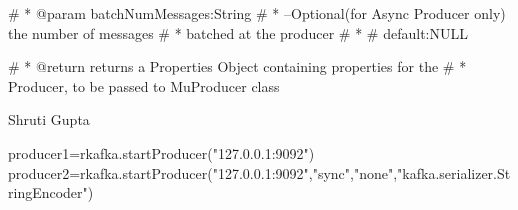 \documentclass[letterpaper]{book}
\begin{document}
\begin{Arguments}
\begin{ldescription}
\item[\code{batchNumMessages}] 
\#     * @param batchNumMessages:String
\#   *            --Optional(for Async Producer only) the number of messages
\#   *            batched at the producer
\#   * \#               default:NULL

\end{ldescription}
\end{Arguments}
%
\begin{Value}
\#     * @return returns a Properties Object containing properties for the
\#   *         Producer, to be passed to MuProducer class
\end{Value}
%
\begin{Author}\relax
Shruti Gupta
\end{Author}
%
\begin{Examples}
\begin{ExampleCode}
producer1=rkafka.startProducer("127.0.0.1:9092")
producer2=rkafka.startProducer("127.0.0.1:9092","sync","none","kafka.serializer.StringEncoder")
  
\end{ExampleCode}
\end{Examples}
\printindex{}
\end{document}
